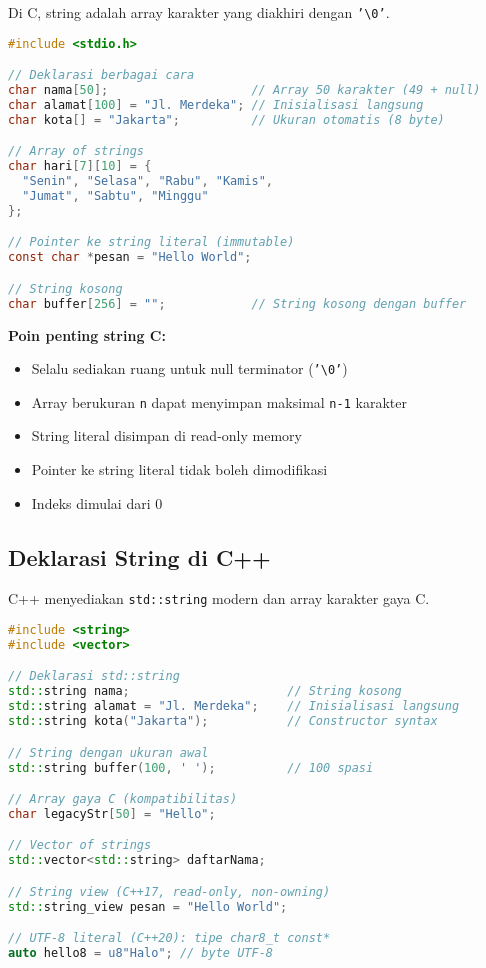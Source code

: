 \documentclass[../main.tex]{subfiles}
\begin{document}
Di C, string adalah array karakter yang diakhiri dengan \texttt{'\textbackslash 0'}.

\begin{lstlisting}[language=C, caption={Deklarasi string di C}]
#include <stdio.h>

// Deklarasi berbagai cara
char nama[50];                    // Array 50 karakter (49 + null)
char alamat[100] = "Jl. Merdeka"; // Inisialisasi langsung
char kota[] = "Jakarta";          // Ukuran otomatis (8 byte)

// Array of strings
char hari[7][10] = {
  "Senin", "Selasa", "Rabu", "Kamis",
  "Jumat", "Sabtu", "Minggu"
};

// Pointer ke string literal (immutable)
const char *pesan = "Hello World";

// String kosong
char buffer[256] = "";            // String kosong dengan buffer
\end{lstlisting}

\textbf{Poin penting string C:}
\begin{itemize}
  \item Selalu sediakan ruang untuk null terminator (\texttt{'\textbackslash 0'})
  \item Array berukuran \texttt{n} dapat menyimpan maksimal \texttt{n-1} karakter
  \item String literal disimpan di read-only memory
  \item Pointer ke string literal tidak boleh dimodifikasi
  \item Indeks dimulai dari 0
\end{itemize}

\subsection{Deklarasi String di C++}

C++ menyediakan \texttt{std::string} modern dan array karakter gaya C.

\begin{lstlisting}[language=C++, caption={Deklarasi string di C++}]
#include <string>
#include <vector>

// Deklarasi std::string
std::string nama;                      // String kosong
std::string alamat = "Jl. Merdeka";    // Inisialisasi langsung
std::string kota("Jakarta");           // Constructor syntax

// String dengan ukuran awal
std::string buffer(100, ' ');          // 100 spasi

// Array gaya C (kompatibilitas)
char legacyStr[50] = "Hello";

// Vector of strings
std::vector<std::string> daftarNama;

// String view (C++17, read-only, non-owning)
std::string_view pesan = "Hello World";

// UTF-8 literal (C++20): tipe char8_t const*
auto hello8 = u8"Halo"; // byte UTF-8
\end{lstlisting}
\end{document}

